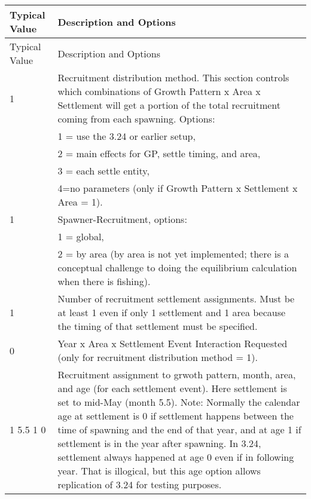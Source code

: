 	
\begin{longtable}{p{0.5cm} p{2cm} p{12cm}}
	\hline
	\multicolumn{2}{l}{Typical Value} & Description and Options\Tstrut\Bstrut\\
	\hline
	\endfirsthead

	\hline
	\multicolumn{2}{l}{Typical Value} & Description and Options\Tstrut\Bstrut\\
	\hline
	\endhead

	\hline
	\endfoot

	\endlastfoot

	1 \Tstrut & & Recruitment distribution method. This section controls which combinations of Growth Pattern x Area x Settlement will get a portion of the total recruitment coming from each spawning.  Options: \\
	  & & 1 = use the 3.24 or earlier setup, \\
	  & & 2 = main effects for GP, settle timing, and area, \\
	  & & 3 = each settle entity, \\
	  & & 4=no parameters (only if Growth Pattern x Settlement x Area = 1). \Bstrut\\

	\hline
	1 & & Spawner-Recruitment, options: \Tstrut\\
	  & & 1 = global, \\
	  & & 2 = by area (by area is not yet implemented; there is a conceptual challenge to doing the equilibrium calculation when there is fishing).\Bstrut\\

	\hline
	1 \Tstrut & & Number of recruitment settlement assignments.  Must be at least 1 even if only 1 settlement and 1 area because the timing of that settlement must be specified.\Bstrut\\

	\hline
	0 \Tstrut & & Year x Area x Settlement Event Interaction Requested (only for recruitment distribution method = 1). \Bstrut\\

	\hline
	\multicolumn{2}{l}{1 5.5 1 0} \Tstrut & Recruitment assignment to grwoth pattern, month, area, and age (for each settlement event).  Here settlement is set to mid-May (month 5.5). Note:  Normally the calendar age at settlement is 0 if settlement happens between the time of spawning and the end of that year, and at age 1 if settlement is in the year after spawning.  In 3.24, settlement always happened at age 0 even if in following year.  That is illogical, but this age option allows replication of 3.24 for testing purposes.
	\Bstrut\\
	\hline
\end{longtable}


